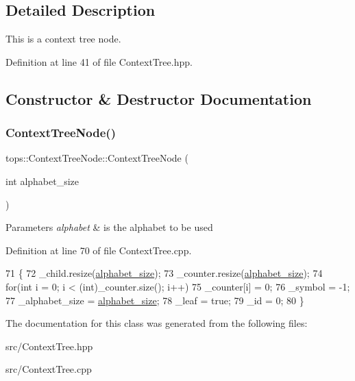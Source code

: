 \subsection{Detailed Description}
This is a context tree node. 

Definition at line 41 of file Context\+Tree.\+hpp.



\subsection{Constructor \& Destructor Documentation}
\mbox{\label{classtops_1_1ContextTreeNode_aef430feff82a67af06846a485d544a72}} 
\subsubsection{\texorpdfstring{Context\+Tree\+Node()}{ContextTreeNode()}}
{\footnotesize\ttfamily tops\+::\+Context\+Tree\+Node\+::\+Context\+Tree\+Node (\begin{DoxyParamCaption}\item[{int}]{alphabet\+\_\+size }\end{DoxyParamCaption})}


\begin{DoxyParams}{Parameters}
{\em alphabet} & is the alphabet to be used \\
\hline
\end{DoxyParams}


Definition at line 70 of file Context\+Tree.\+cpp.


\begin{DoxyCode}
71   \{
72     \_child.resize(\hyperlink{classtops_1_1ContextTreeNode_ad0596678234c3ae9ebcd61a18f7cc744}{alphabet\_size});
73     \_counter.resize(\hyperlink{classtops_1_1ContextTreeNode_ad0596678234c3ae9ebcd61a18f7cc744}{alphabet\_size});
74     \textcolor{keywordflow}{for}(\textcolor{keywordtype}{int} i = 0; i < (int)\_counter.size(); i++)
75       \_counter[i] = 0;
76     \_symbol = -1;
77     \_alphabet\_size = \hyperlink{classtops_1_1ContextTreeNode_ad0596678234c3ae9ebcd61a18f7cc744}{alphabet\_size};
78     \_leaf = \textcolor{keyword}{true};
79     \_id = 0;
80   \}
\end{DoxyCode}


The documentation for this class was generated from the following files\+:\begin{DoxyCompactItemize}
\item 
src/Context\+Tree.\+hpp\item 
src/Context\+Tree.\+cpp\end{DoxyCompactItemize}
